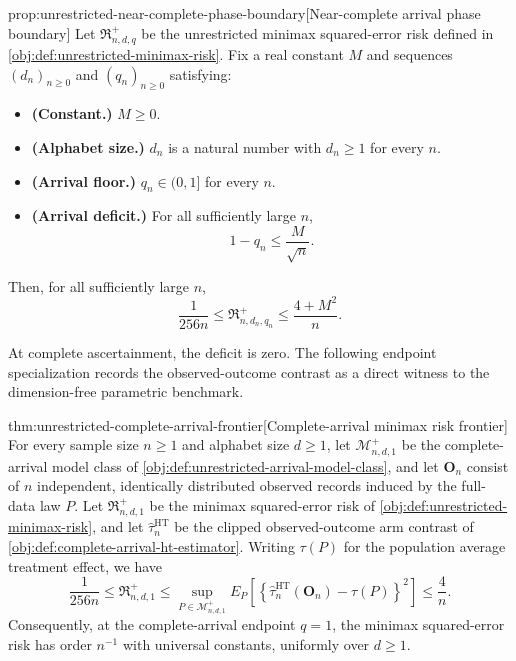 \begin{propositionv}{prop:unrestricted-near-complete-phase-boundary}[Near-complete arrival phase boundary]
Let \(\mathfrak R^{+}_{n,d,q}\) be the unrestricted minimax squared-error risk defined in \cref{obj:def:unrestricted-minimax-risk}. Fix a real constant \(M\) and sequences \((d_n)_{n\ge0}\) and \((q_n)_{n\ge0}\) satisfying:
\begin{itemize}
\item \textbf{(Constant.)} \(M\ge0\).
\item \textbf{(Alphabet size.)} \(d_n\) is a natural number with \(d_n\ge1\) for every \(n\).
\item \textbf{(Arrival floor.)} \(q_n\in(0,1]\) for every \(n\).
\item \textbf{(Arrival deficit.)} For all sufficiently large \(n\),
\[
1-q_n\le \frac{M}{\sqrt n}.
\]
\end{itemize}
Then, for all sufficiently large \(n\),
\[
\frac{1}{256n}
\le \mathfrak R^{+}_{n,d_n,q_n}
\le \frac{4+M^2}{n}.
\]
\end{propositionv}

At complete ascertainment, the deficit is zero. The following endpoint specialization records the observed-outcome contrast as a direct witness to the dimension-free parametric benchmark.

\begin{theoremv}{thm:unrestricted-complete-arrival-frontier}[Complete-arrival minimax risk frontier]
For every sample size \(n\ge 1\) and alphabet size \(d\ge 1\), let \(\mathcal M^{+}_{n,d,1}\) be the complete-arrival model class of \cref{obj:def:unrestricted-arrival-model-class}, and let \(\mathbf O_n\) consist of \(n\) independent, identically distributed observed records induced by the full-data law \(P\). Let \(\mathfrak R^{+}_{n,d,1}\) be the minimax squared-error risk of \cref{obj:def:unrestricted-minimax-risk}, and let \(\widehat\tau^{\mathrm{HT}}_n\) be the clipped observed-outcome arm contrast of \cref{obj:def:complete-arrival-ht-estimator}. Writing \(\tau(P)\) for the population average treatment effect, we have
\[
\frac{1}{256n}
\le \mathfrak R^{+}_{n,d,1}
\le
\sup_{P\in\mathcal M^{+}_{n,d,1}}
E_P\!\left[
\left\{\widehat\tau^{\mathrm{HT}}_n(\mathbf O_n)-\tau(P)\right\}^{2}
\right]
\le \frac{4}{n}.
\]
Consequently, at the complete-arrival endpoint \(q=1\), the minimax squared-error risk has order \(n^{-1}\) with universal constants, uniformly over \(d\ge 1\).
\end{theoremv}

